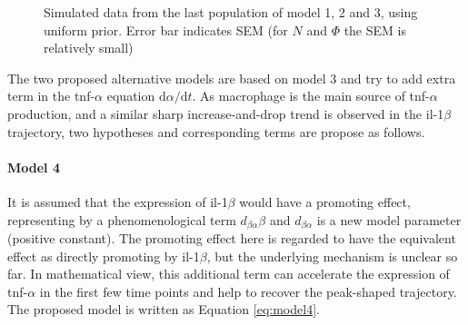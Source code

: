 \begin{figure}[h]
    \begin{center}
    \end{center}

    \caption[Simulated data from the last population of model 1, 2 and 3, using uniform prior]{Simulated data from the last population of model 1, 2 and 3, using uniform prior.  Error bar indicates SEM (for $N$ and $\Phi$ the SEM is relatively small)}
    \label{fig:resultCurve_uni}
\end{figure}

The two proposed alternative models are based on model 3 and try to add extra term in the tnf-$\alpha$ equation $\mathrm{d} \alpha/\mathrm{d} t$. As macrophage is the main source of tnf-$\alpha$ production, and a similar sharp increase-and-drop trend is observed in the il-1$\beta$ trajectory, two hypotheses and corresponding terms are propose as follows.

\paragraph{Model 4} It is assumed that the expression of il-1$\beta$ would have a promoting effect, representing by a phenomenological term $d_{\beta\alpha}\beta$ and $d_{\beta\alpha}$ is a new model parameter (positive constant). The promoting effect here is regarded to have the equivalent effect as directly promoting by il-1$\beta$, but the underlying mechanism is unclear so far. In mathematical view, this additional term can accelerate the expression of tnf-$\alpha$ in the first few time points and help to recover the peak-shaped trajectory. The proposed model is written as Equation \ref{eq:model4}.

